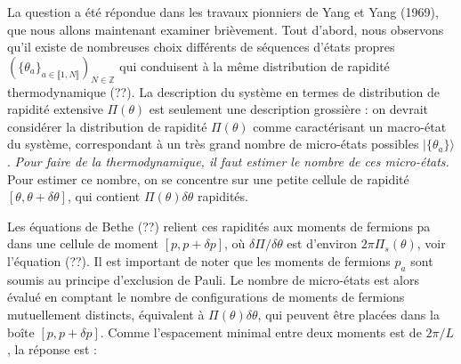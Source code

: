	La question a été répondue dans les travaux pionniers de Yang et Yang (1969), que nous allons maintenant examiner brièvement. Tout d'abord, nous observons qu'il existe de nombreuses choix différents de séquences d'états propres $(\{\theta_a\}_{ a \in \llbracket 1 , N \rrbracket} )_{ N \in \mathbb{Z}}$ qui conduisent à la même distribution de rapidité thermodynamique (??). La description du système en termes de distribution de rapidité extensive $\Pi( \theta ) $ est seulement une description grossière : on devrait considérer la distribution de rapidité $\Pi ( \theta ) $ comme caractérisant un macro-état du système, correspondant à un très grand nombre de micro-états possibles $\vert \{ \theta_a \} \rangle $. {\em Pour faire de la thermodynamique, il faut estimer le nombre de ces micro-états.}\\
	
	Pour estimer ce nombre, on se concentre sur une petite cellule de rapidité $[\theta, \theta+\delta\theta]$, qui contient $\Pi(\theta) \delta \theta$ rapidités. 
	
	\begin{figure}[H]
		\centering 
		\captionsetup{skip=10pt} %
	\end{figure}
	
	
	
	
Les équations de Bethe (??) relient ces rapidités aux moments de fermions pa dans une cellule de moment $[p, p+\delta p]$, où $\delta \Pi/\delta \theta$ est d'environ $2\pi \Pi_s(\theta)$, voir l'équation (??). Il est important de noter que les moments de fermions $p_a$ sont soumis au principe d'exclusion de Pauli. Le nombre de micro-états est alors évalué en comptant le nombre de configurations de moments de fermions mutuellement distincts, équivalent à $\Pi (\theta)\delta \theta$, qui peuvent être placées dans la boîte $[p, p + \delta p]$. Comme l'espacement minimal entre deux moments est de $2\pi /L$, la réponse est :
	
